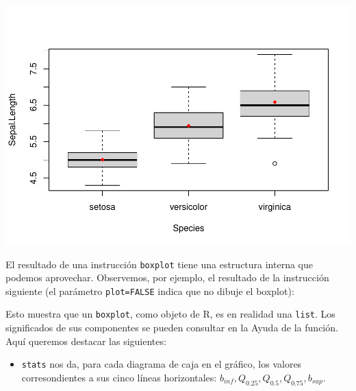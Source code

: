 \documentclass[
]{book}
\newenvironment{Shaded}{\begin{snugshade}}{\end{snugshade}}
\newcommand{\CommentTok}[1]{\textcolor[rgb]{0.56,0.35,0.01}{\textit{#1}}}
\newcommand{\DataTypeTok}[1]{\textcolor[rgb]{0.13,0.29,0.53}{#1}}
\newcommand{\KeywordTok}[1]{\textcolor[rgb]{0.13,0.29,0.53}{\textbf{#1}}}
\newcommand{\NormalTok}[1]{#1}
\newcommand{\OperatorTok}[1]{\textcolor[rgb]{0.81,0.36,0.00}{\textbf{#1}}}
\newcommand{\OtherTok}[1]{\textcolor[rgb]{0.56,0.35,0.01}{#1}}
\providecommand{\tightlist}{%
  \setlength{\itemsep}{0pt}\setlength{\parskip}{0pt}}
\theoremstyle{definition}
\theoremstyle{definition}
\theoremstyle{definition}
\theoremstyle{remark}
\begin{document}
\begin{center}\includegraphics[width=0.9\linewidth]{12chap12_Descripcion_cuantitativos_files/figure-latex/unnamed-chunk-50-1} \end{center}

El resultado de una instrucción \texttt{boxplot} tiene una estructura interna que podemos aprovechar. Observemos, por ejemplo, el resultado de la instrucción siguiente (el parámetro \texttt{plot=FALSE} indica que no dibuje el boxplot):

\begin{Shaded}
\end{Shaded}

Esto muestra que un \texttt{boxplot}, como objeto de R, es en realidad una \texttt{list}. Los significados de sus componentes se pueden consultar en la Ayuda de la función. Aquí queremos destacar las siguientes:

\begin{itemize}
\tightlist
\item
  \texttt{stats} nos da, para cada diagrama de caja en el gráfico, los valores corresondientes a sus cinco líneas horizontales: \(b_{inf}, Q_{0.25}, Q_{0.5}, Q_{0.75}, b_{sup}\).
\end{itemize}
\end{document}
